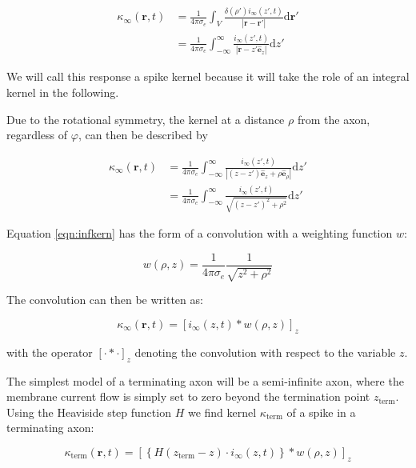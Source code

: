 \documentclass[]{article}
\begin{document}
\begin{align}
\kappa_{\infty}(\mathbf{r},t) & =\frac{1}{4\pi\sigma_{e}}\int_{V}\frac{\delta(\rho')i_{\infty}(z',t)}{|\mathbf{r}-\mathbf{r}'|}\textrm{d}\mathbf{r}'\label{eq:halfline}\\
& =\frac{1}{4\pi\sigma_{e}}\int_{-\infty}^{\infty}\frac{i_{\infty}(z',t)}{|\mathbf{r}-z'\hat{\mathbf{e}}_{z}|}\textrm{d}z'
\end{align}

We will call this response a spike kernel because it will take the role
of an integral kernel in the following.

Due to the rotational symmetry, the kernel at a distance \(\rho\) from
the axon, regardless of \(\varphi\), can then be described by

\begin{align} \label{eqn:infkern}
\kappa_{\infty}(\mathbf{r},t) & =\frac{1}{4\pi\sigma_{e}}\int_{-\infty}^{\infty}\frac{i_{\infty}(z',t)}{|(z-z')\hat{\mathbf{e}}_{z} + \rho\hat{\mathbf{e}}_{\rho}|}\textrm{d}z' \\
& =\frac{1}{4\pi\sigma_{e}}\int_{-\infty}^{\infty}\frac{i_{\infty}(z',t)}{\sqrt{(z-z')^2 + \rho^2}}\textrm{d}z' 
\end{align}

Equation \ref{eqn:infkern} has the form of a convolution with a
weighting function \(w\):

\begin{equation}
  w(\rho,z) = \frac{1}{4\pi\sigma_e}\frac{1}{\sqrt{z^2+\rho^2}}
  \label{eqn:weighting}
\end{equation}

The convolution can then be written as:

\begin{equation}
\kappa_{\infty}(\mathbf{r},t) = \left[i_{\infty}(z,t)\ast w(\rho,z)\right]_z
\end{equation}

with the operator \(\left[\cdot\ast\cdot\right]_z\) denoting the
convolution with respect to the variable \(z\).

The simplest model of a terminating axon will be a semi-infinite axon,
where the membrane current flow is simply set to zero beyond the
termination point \(z_\text{term}\). Using the Heaviside step function
\(H\) we find kernel \(\kappa_{\text{term}}\) of a spike in a
terminating axon:

\begin{equation}
  \kappa_{\text{term}}(\mathbf{r},t) = \left[\left\{H(z_\text{term}-z)\cdot i_{\infty}(z,t)\right\}\ast w(\rho,z)\right]_z
\end{equation}
\end{document}
